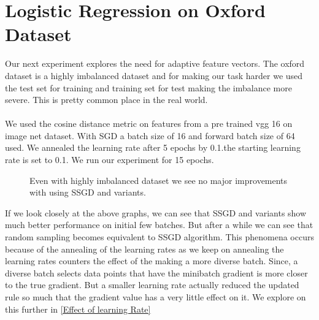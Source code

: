 \documentclass[a4paper,twoside]{iiththesis}
\theoremstyle{definition}
\theoremstyle{definition}
\theoremstyle{remark}
\begin{document}
\newpage
\section{Logistic Regression on Oxford Dataset}
Our next experiment explores the need for adaptive feature vectors.
The oxford dataset is a highly imbalanced dataset and for making our task harder we used the test set for training and training set for test making the imbalance more severe. This is pretty common place in the real world.\\ \\
We used the cosine distance metric on features from a pre trained vgg 16 on image net dataset. With SGD a batch size of 16 and forward batch size of 64 used. We annealed the learning rate after 5 epochs by 0.1.the starting learning rate is set to 0.1. We run our experiment for 15 epochs.
\begin{figure}[H]
    \caption{Even with highly imbalanced dataset we see no major improvements with using SSGD and variants.}
    \label{fig:Oxford}
\end{figure}

If we look closely at the above graphs, we can see that SSGD and variants show much better performance on initial few batches. But after a while we can see that random sampling becomes equivalent to SSGD algorithm. This phenomena occurs because of the annealing of the learning rates as we keep on annealing the learning rates counters the effect of the making a more diverse batch. Since, a diverse batch selects data points that have the minibatch gradient is more closer to the true gradient. But a smaller learning rate actually reduced the updated rule so much that the gradient value has a very little effect on it. We explore on this further in \ref{Effect of learning Rate}
\end{document}
